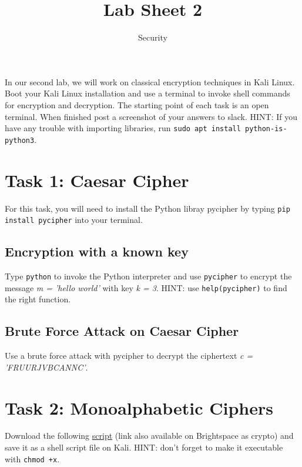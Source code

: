 \documentclass{article}
\title{Lab Sheet 2}
\date{Security}
\begin{document}
\maketitle

In our second lab, we will work on classical encryption techniques in Kali Linux. Boot your Kali Linux installation and use a terminal to invoke shell commands for encryption and decryption. The starting point of each task is an open terminal. When finished post a screenshot of your answers to slack. HINT: If you have any trouble with importing libraries, run \texttt{sudo apt install python-is-python3}.

\section{Task 1: Caesar Cipher}
For this task, you will need to install the Python libray pycipher by typing \texttt{pip install pycipher} into your terminal.

\subsection{Encryption with a known key}
Type \texttt{python} to invoke the Python interpreter and use \texttt{pycipher} to encrypt the message \textit{m = 'hello world'} with key \textit{k = 3}.
HINT: use \texttt{help(pycipher)} to find the right function.

\subsection{Brute Force Attack on Caesar Cipher}
Use a brute force attack with pycipher to decrypt the ciphertext \textit{c = 'FRUURJVBCANNC'}.

\section{Task 2: Monoalphabetic Ciphers}
Download the following \href{https://tinyurl.com/y6qfe2bq}{script} (link also available on Brightspace as crypto) and save it as a shell script file on Kali. HINT: don't forget to make it executable with \texttt{chmod +x}.
\end{document}
